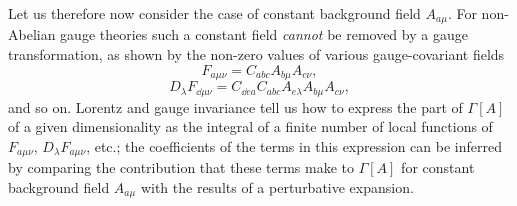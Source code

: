 Let us therefore now consider the case of constant background field
$A_{a\mu}$. For non-Abelian gauge theories such a constant field
\emph{cannot} be removed by a gauge transformation, as shown by the non-zero
values of various gauge-covariant fields
\begin{equation}
F_{a\mu\nu}=C_{abc}A_{b\mu}A_{c\nu},
\label{eq:17.5.11}
\end{equation}
\begin{equation}
D_\lambda F_{\dd\mu\nu}
=C_{\dd ea}C_{abc}
A_{e\lambda}A_{b\mu}A_{c\nu},
\label{eq:17.5.12}
\end{equation}
and so on. Lorentz and gauge invariance tell us how to express the part
of $\Gamma[A]$ of a given dimensionality as the integral of a finite number
of local functions of $F_{a\mu\nu}$, $D_\lambda F_{a\mu\nu}$, etc.;
the coefficients of the terms in this expression can be inferred by comparing
the contribution that these terms make to $\Gamma[A]$ for constant background
field $A_{a\mu}$ with the results of a perturbative expansion.

